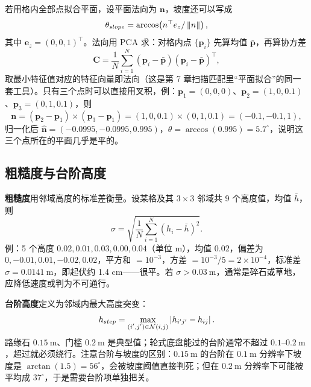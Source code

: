 若用格内全部点拟合平面，设平面法向为 $\bm{n}$，坡度还可以写成
\begin{equation}
  \theta_{slope}=\arccos\!\left(n^{\top}e_z/\left\lVert n \right\rVert\right),
  \label{eq:21-slope-normal}
\end{equation}
其中 $\bm{e}_z=(0,0,1)^{\top}$。法向用 PCA 求：对格内点 $\{\bm{p}_i\}$ 先算均值 $\bar{\bm{p}}$，再算协方差
\begin{equation}
  \bm{C}=\frac{1}{N}\sum_{i=1}^{N}(\bm{p}_i-\bar{\bm{p}})(\bm{p}_i-\bar{\bm{p}})^{\top},
  \label{eq:21-cov}
\end{equation}
取最小特征值对应的特征向量即法向（这是第 7 章扫描匹配里“平面拟合”的同一套工具）。只有三个点时可以直接用叉积，例：$\bm{p}_1=(0,0,0)$、$\bm{p}_2=(1,0,0.1)$、$\bm{p}_3=(0,1,0.1)$，则
\begin{equation}
  \bm{n}=(\bm{p}_2-\bm{p}_1)\times(\bm{p}_3-\bm{p}_1)=(1,0,0.1)\times(0,1,0.1)=(-0.1,-0.1,1),
\end{equation}
归一化后 $\hat{\bm{n}}=(-0.0995,-0.0995,0.995)$，$\theta=\arccos(0.995)=5.7^\circ$，说明这三个点所在的平面几乎是平的。

\subsection{粗糙度与台阶高度}

\textbf{粗糙度}用邻域高度的标准差衡量。设某格及其 $3\times3$ 邻域共 9 个高度值，均值 $\bar h$，则
\begin{equation}
  \sigma=\sqrt{\frac{1}{N}\sum_{i=1}^{N}(h_i-\bar h)^2}.
  \label{eq:21-rough}
\end{equation}
例：5 个高度 $0.02,0.01,0.03,0.00,0.04$（单位 m），均值 $0.02$，偏差为 $0,-0.01,0.01,-0.02,0.02$，平方和 $=10^{-3}$，方差 $=10^{-3}/5=2\times10^{-4}$，标准差 $\sigma=0.0141\ \mathrm{m}$，即起伏约 1.4 cm——很平。若 $\sigma>0.03\ \mathrm{m}$，通常是碎石或草地，应降低速度或判为不可通行。

\textbf{台阶高度}定义为邻域内最大高度突变：
\begin{equation}
  h_{step}=\max_{\substack{(i',j')\in\mathcal{N}(i,j)}}\left\lvert h_{i'j'}-h_{ij} \right\rvert.
  \label{eq:21-step}
\end{equation}
路缘石 $0.15\ \mathrm{m}$、门槛 $0.2\ \mathrm{m}$ 是典型值；轮式底盘能过的台阶通常不超过 $0.1$--$0.2\ \mathrm{m}$，超过就必须绕行。注意台阶与坡度的区别：$0.15\ \mathrm{m}$ 的台阶在 $0.1\ \mathrm{m}$ 分辨率下坡度是 $\arctan(1.5)=56^\circ$，会被坡度阈值直接判死；但在 $0.2\ \mathrm{m}$ 分辨率下可能被平均成 $37^\circ$，于是需要台阶项单独把关。

